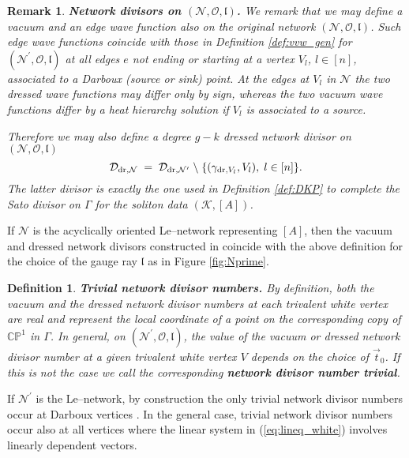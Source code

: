 \documentclass[11pt]{amsart}
\theoremstyle{plain}
\numberwithin{equation}{section}
\newtheorem{remark}{Remark}[subsection]
\newtheorem{definition}{Definition}[subsection]
\def \DDN {{\mathcal D}_{\textup{\scriptsize dr},{\mathcal N}^{\prime}}}
\def \gdr {\gamma_{\textup{\scriptsize dr},V_l}}
\begin{document}
\begin{remark}\label{rem:div_N}\textbf{Network divisors on $(\mathcal N, \mathcal O, \mathfrak{l})$.}
We remark that we may define a vacuum and an edge wave function also on the original network $(\mathcal N, \mathcal O, \mathfrak{l})$. Such edge wave functions coincide with those in Definition \ref{def:vvw_gen} for $(\mathcal N^{\prime}, \mathcal O, \mathfrak{l})$ at all edges $e$ not ending or starting at a vertex $V_l$, $l\in [n]$, associated to a Darboux (source or sink) point. At the edges at $V_l$ in $\mathcal N$ the two dressed wave functions may differ only by sign, whereas the two vacuum wave functions differ by a heat hierarchy solution if $V_l$ is associated to a source. 

Therefore we may also define a degree $g-k$ dressed network divisor on $(\mathcal N, \mathcal O, \mathfrak{l})$
\begin{equation}\label{eq:net_div_N}
{\mathcal D}_{\textup{\scriptsize dr},{\mathcal N}} \; = \; \DDN \; \backslash \; \{ (\gdr, V_l), \; l\in [n]  \}.
\end{equation}
The latter divisor is exactly the one used in Definition \ref{def:DKP} to complete the Sato divisor on $\Gamma$ for the soliton data $(\mathcal K, [A])$.
\end{remark}

If $\mathcal N$ is the acyclically oriented Le--network representing $[A]$, then the vacuum and dressed network divisors constructed in \cite{AG3} coincide with the above definition for the choice of the gauge ray $\mathfrak l$ as in Figure \ref{fig:Nprime}.

\begin{definition}\label{def:triv_div}\textbf{Trivial network divisor numbers.}
By definition, both the vacuum and the dressed network divisor numbers at each trivalent white vertex are real and represent the local coordinate of a point on the corresponding copy of $\mathbb{CP}^1$ in $\Gamma$. In general, on $({\mathcal N}^{\prime}, \mathcal O,\mathfrak l)$, the value of the vacuum or dressed network divisor number at a given trivalent white vertex $V$ depends on the choice of $\vec t_0$. If this is not the case we call the corresponding \textbf{network divisor number trivial}.
\end{definition}

If ${\mathcal N}^{\prime}$ is the Le--network, by construction the only trivial network divisor numbers occur at Darboux vertices \cite{AG3}. In the general case, trivial network divisor numbers occur also at all vertices where the linear system in (\ref{eq:lineq_white}) involves linearly dependent vectors.
 
\end{document}
